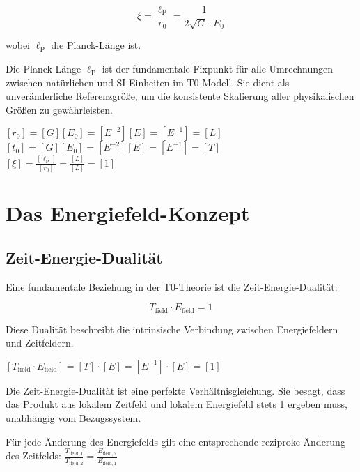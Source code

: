 \documentclass[12pt,a4paper]{article}
\newcommand{\tfield}{T_{\text{field}}}
\newcommand{\efield}{E_{\text{field}}}
\newcommand{\lp}{\ell_{\text{P}}}
\theoremstyle{definition}
\begin{document}
\begin{equation}
	\xi = \frac{\lp}{r_0} = \frac{1}{2\sqrt{G} \cdot E_0}
\end{equation}

wobei $\lp$ die Planck-Länge ist.

\begin{wichtig}
	Die Planck-Länge $\lp$ ist der fundamentale Fixpunkt für alle Umrechnungen zwischen natürlichen und SI-Einheiten im T0-Modell. Sie dient als unveränderliche Referenzgröße, um die konsistente Skalierung aller physikalischen Größen zu gewährleisten.
\end{wichtig}

\begin{einheitencheck}
	$[r_0] = [G][E_0] = [E^{-2}][E] = [E^{-1}] = [L]$ \checkmark\\
	$[t_0] = [G][E_0] = [E^{-2}][E] = [E^{-1}] = [T]$ \checkmark\\
	$[\xi] = \frac{[\lp]}{[r_0]} = \frac{[L]}{[L]} = [1]$ \checkmark
\end{einheitencheck}
	\section{Das Energiefeld-Konzept}
	
	\subsection{Zeit-Energie-Dualität}
	
	Eine fundamentale Beziehung in der T0-Theorie ist die Zeit-Energie-Dualität:
	
	\begin{equation}
		\boxed{\tfield \cdot \efield = 1}
	\end{equation}
	
	Diese Dualität beschreibt die intrinsische Verbindung zwischen Energiefeldern und Zeitfeldern.
	
	\begin{einheitencheck}
		$[\tfield \cdot \efield] = [T] \cdot [E] = [E^{-1}] \cdot [E] = [1]$ \checkmark
	\end{einheitencheck}
	
	\begin{verhaltnis}
		Die Zeit-Energie-Dualität ist eine perfekte Verhältnisgleichung. Sie besagt, dass das Produkt aus lokalem Zeitfeld und lokalem Energiefeld stets 1 ergeben muss, unabhängig vom Bezugssystem.
		
		Für jede Änderung des Energiefelds gilt eine entsprechende reziproke Änderung des Zeitfelds:
		$\frac{T_{\text{field},1}}{T_{\text{field},2}} = \frac{E_{\text{field},2}}{E_{\text{field},1}}$
	\end{verhaltnis}
	
\end{document}
